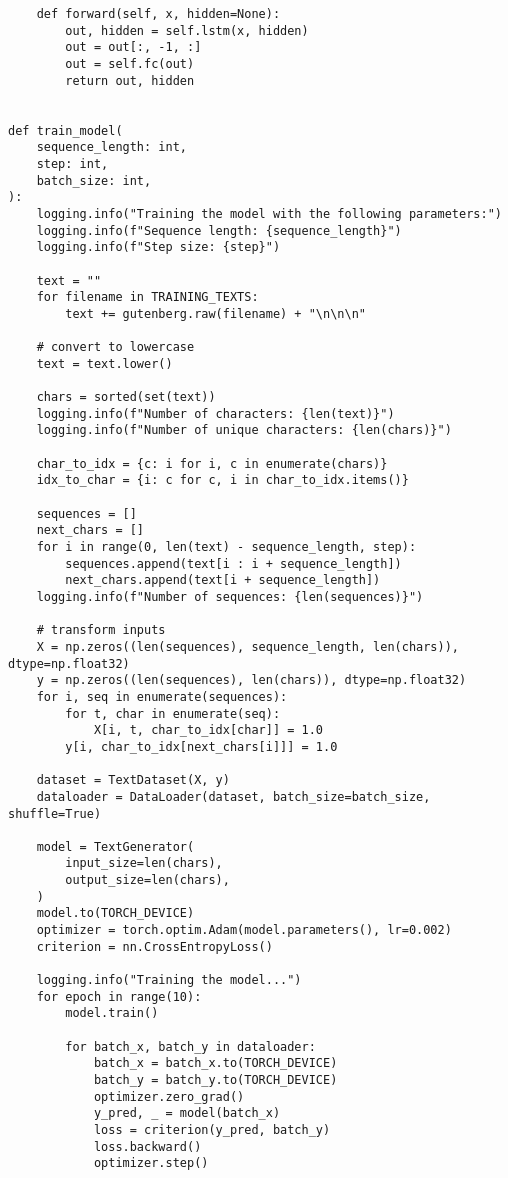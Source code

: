 \documentclass{article}
\begin{document}
\begin{lstlisting}
    def forward(self, x, hidden=None):
        out, hidden = self.lstm(x, hidden)
        out = out[:, -1, :]
        out = self.fc(out)
        return out, hidden


def train_model(
    sequence_length: int,
    step: int,
    batch_size: int,
):
    logging.info("Training the model with the following parameters:")
    logging.info(f"Sequence length: {sequence_length}")
    logging.info(f"Step size: {step}")

    text = ""
    for filename in TRAINING_TEXTS:
        text += gutenberg.raw(filename) + "\n\n\n"

    # convert to lowercase
    text = text.lower()

    chars = sorted(set(text))
    logging.info(f"Number of characters: {len(text)}")
    logging.info(f"Number of unique characters: {len(chars)}")

    char_to_idx = {c: i for i, c in enumerate(chars)}
    idx_to_char = {i: c for c, i in char_to_idx.items()}

    sequences = []
    next_chars = []
    for i in range(0, len(text) - sequence_length, step):
        sequences.append(text[i : i + sequence_length])
        next_chars.append(text[i + sequence_length])
    logging.info(f"Number of sequences: {len(sequences)}")

    # transform inputs
    X = np.zeros((len(sequences), sequence_length, len(chars)), dtype=np.float32)
    y = np.zeros((len(sequences), len(chars)), dtype=np.float32)
    for i, seq in enumerate(sequences):
        for t, char in enumerate(seq):
            X[i, t, char_to_idx[char]] = 1.0
        y[i, char_to_idx[next_chars[i]]] = 1.0

    dataset = TextDataset(X, y)
    dataloader = DataLoader(dataset, batch_size=batch_size, shuffle=True)

    model = TextGenerator(
        input_size=len(chars),
        output_size=len(chars),
    )
    model.to(TORCH_DEVICE)
    optimizer = torch.optim.Adam(model.parameters(), lr=0.002)
    criterion = nn.CrossEntropyLoss()

    logging.info("Training the model...")
    for epoch in range(10):
        model.train()

        for batch_x, batch_y in dataloader:
            batch_x = batch_x.to(TORCH_DEVICE)
            batch_y = batch_y.to(TORCH_DEVICE)
            optimizer.zero_grad()
            y_pred, _ = model(batch_x)
            loss = criterion(y_pred, batch_y)
            loss.backward()
            optimizer.step()


\end{lstlisting}
\end{document}
